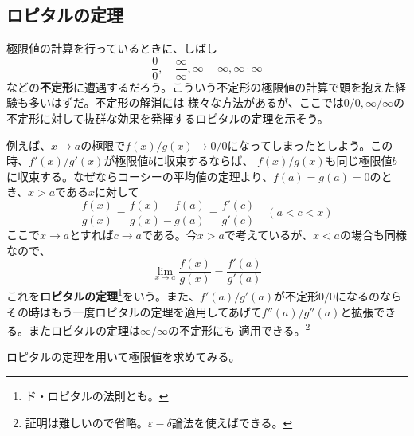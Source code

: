 \documentclass[a4j,dvipdfmx]{jsarticle}
\begin{document}
                \clearpage
                \subsection{ロピタルの定理}
                    極限値の計算を行っているときに、しばし
                    \begin{equation*}
                        \frac{0}{0},\quad\frac{\infty}{\infty},\infty -\infty,\infty\cdot\infty
                    \end{equation*}
                    などの\textbf{不定形}に遭遇するだろう。こういう不定形の極限値の計算で頭を抱えた経験も多いはずだ。不定形の解消には
                    様々な方法があるが、ここでは$0/0,\infty/\infty$の不定形に対して抜群な効果を発揮するロピタルの定理を示そう。
                    
                    例えば、$x\to a$の極限で$f(x)/g(x)\to 0/0$になってしまったとしよう。この時、$f'(x)/g'(x)$が極限値$b$に収束するならば、
                    $f(x)/g(x)$も同じ極限値$b$に収束する。なぜならコーシーの平均値の定理より、$f(a)=g(a)=0$のとき、$x>a$である$x$に対して
                    \begin{equation*}
                        \frac{f(x)}{g(x)}=\frac{f(x)-f(a)}{g(x)-g(a)}=\frac{f'(c)}{g'(c)}\quad(a<c<x)
                    \end{equation*}
                    ここで$x\to a$とすれば$c\to a$である。今$x>a$で考えているが、$x<a$の場合も同様なので、
                    \begin{equation}
                        \lim_{x\to a}\frac{f(x)}{g(x)}=\frac{f'(a)}{g'(a)}\label{ロピタルの定理}
                    \end{equation}
                    これを\textbf{ロピタルの定理}\footnote{ド・ロピタルの法則とも。}をいう。また、$f'(a)/g'(a)$が不定形$0/0$になるのなら
                    その時はもう一度ロピタルの定理を適用してあげて$f''(a)/g''(a)$と拡張できる。またロピタルの定理は$\infty/\infty$の不定形にも
                    適用できる。\footnote{証明は難しいので省略。$\varepsilon-\delta$論法を使えばできる。}

                    ロピタルの定理を用いて極限値を求めてみる。
\end{document}
